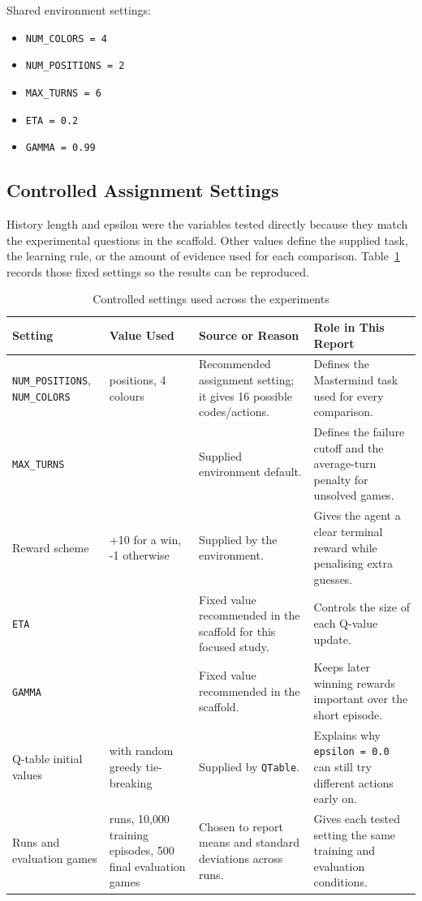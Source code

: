 \documentclass[11pt,a4paper]{article}
\begin{document}
Shared environment settings:

\begin{itemize}[leftmargin=1.5em]
  \item \texttt{NUM\_COLORS = 4}
  \item \texttt{NUM\_POSITIONS = 2}
  \item \texttt{MAX\_TURNS = 6}
  \item \texttt{ETA = 0.2}
  \item \texttt{GAMMA = 0.99}
\end{itemize}

\subsection{Controlled Assignment Settings}

History length and epsilon were the variables tested directly because they match the experimental questions in the scaffold. Other values define the supplied task, the learning rule, or the amount of evidence used for each comparison. Table~\ref{tab:fixed-settings} records those fixed settings so the results can be reproduced.

\begin{table}[H]
\centering
\caption{Controlled settings used across the experiments}
\label{tab:fixed-settings}
\small
\begin{tabular}{@{}>{\raggedright\arraybackslash}p{2.9cm} >{\raggedright\arraybackslash}p{2.5cm} >{\raggedright\arraybackslash}p{4.5cm} >{\raggedright\arraybackslash}p{4.0cm}@{}}
\toprule
Setting & Value Used & Source or Reason & Role in This Report \\
\midrule
\texttt{NUM\_POSITIONS}, \texttt{NUM\_COLORS} & 2 positions, 4 colours & Recommended assignment setting; it gives 16 possible codes/actions. & Defines the Mastermind task used for every comparison. \\
\texttt{MAX\_TURNS} & 6 & Supplied environment default. & Defines the failure cutoff and the average-turn penalty for unsolved games. \\
Reward scheme & +10 for a win, -1 otherwise & Supplied by the environment. & Gives the agent a clear terminal reward while penalising extra guesses. \\
\texttt{ETA} & 0.2 & Fixed value recommended in the scaffold for this focused study. & Controls the size of each Q-value update. \\
\texttt{GAMMA} & 0.99 & Fixed value recommended in the scaffold. & Keeps later winning rewards important over the short episode. \\
Q-table initial values & 0.0 with random greedy tie-breaking & Supplied by \texttt{QTable}. & Explains why \texttt{epsilon = 0.0} can still try different actions early on. \\
Runs and evaluation games & 10 runs, 10{,}000 training episodes, 500 final evaluation games & Chosen to report means and standard deviations across runs. & Gives each tested setting the same training and evaluation conditions. \\
\bottomrule
\end{tabular}
\end{table}
\end{document}
